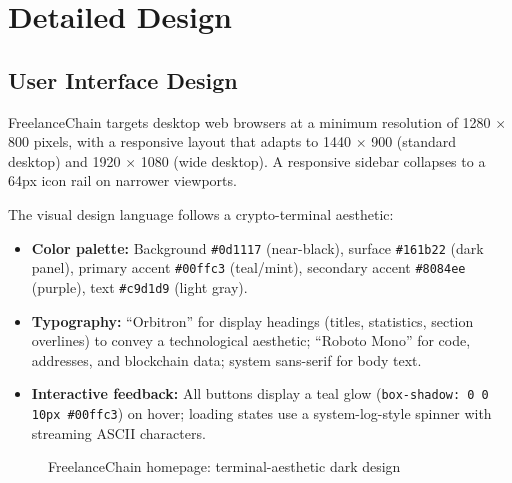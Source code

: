 \section{Detailed Design}
\label{section:4.2}

\subsection{User Interface Design}
\label{subsection:4.2.1}

FreelanceChain targets desktop web browsers at a minimum resolution of 1280 $\times$ 800 pixels, with a responsive layout that adapts to 1440 $\times$ 900 (standard desktop) and 1920 $\times$ 1080 (wide desktop). A responsive sidebar collapses to a 64px icon rail on narrower viewports.

The visual design language follows a crypto-terminal aesthetic:
\begin{itemize}
    \item \textbf{Color palette:} Background \texttt{\#0d1117} (near-black), surface \texttt{\#161b22} (dark panel), primary accent \texttt{\#00ffc3} (teal/mint), secondary accent \texttt{\#8084ee} (purple), text \texttt{\#c9d1d9} (light gray).
    \item \textbf{Typography:} ``Orbitron'' for display headings (titles, statistics, section overlines) to convey a technological aesthetic; ``Roboto Mono'' for code, addresses, and blockchain data; system sans-serif for body text.
    \item \textbf{Interactive feedback:} All buttons display a teal glow (\texttt{box-shadow: 0 0 10px \#00ffc3}) on hover; loading states use a system-log-style spinner with streaming ASCII characters.
\end{itemize}

\begin{figure}[H]
    \centering
    \caption{FreelanceChain homepage: terminal-aesthetic dark design}
    \label{fig:homepage}
\end{figure}

